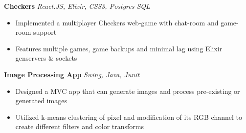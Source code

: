 \documentclass[]{article}
\begin{document}
\vspace{-2mm}
{\hspace{2mm}\textbf{Checkers}} {\sl React.JS, Elixir, CSS3, Postgres SQL} \\
\vspace{-3mm}
\begin{itemize}
        \setlength\itemsep{-1mm}
        \item Implemented a multiplayer Checkers web-game with chat-room and game-room support
        \item Features multiple games, game backups and minimal lag using Elixir genservers \& sockets
\end{itemize}

\vspace{-2mm}
{\hspace{2mm}\textbf{Image Processing App}} {\sl Swing, Java, Junit} \\
\vspace{-3mm}
\begin{itemize}
        \setlength\itemsep{-1mm}
        \item Designed a MVC app that can generate images and process pre-existing or generated images  
        \item Utilized k-means clustering of pixel and modification of its RGB channel to create different filters and color transforms 
\end{itemize}
\end{document}
